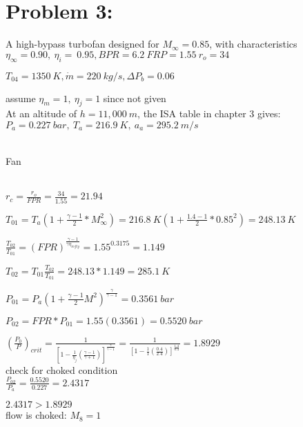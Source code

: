 \documentclass{article}
\begin{document}
\section*{Problem 3:}


A high-bypass turbofan designed for $M_{\infty}=0.85$, with characteristics
\\

$\eta_{\infty}=0.90,\ \eta_{i}=\ 0.95, BPR=6.2\ FRP=1.55\ r_o=34$

$T_{04}=1350\ K, \dot{m}=220\ kg/s, \Delta P_b=0.06$

assume $\eta_m=1,\ \eta_j=1$ since not given
\\

At an altitude of $h=11,000\ m$, the ISA table in chapter 3 gives: 
\\

$P_a=0.227\ bar,\ T_a=216.9\ K,\ a_a=295.2\ m/s$
\\
\\

	\begin{Large}
		Fan
	\end{Large}
\\

$r_c=\frac{r_o}{FPR}=\frac{34}{1.55}=21.94$

$T_{01}=T_a(1+\frac{\gamma-1}{2}*M_{\infty}^{2})=216.8\ K(1+\frac{1.4-1}{2}*0.85^2)=248.13\ K$

$\frac{T_{02}}{T_{01}}=(FPR)^{\frac{\gamma-1}{\gamma \eta_{infty}}}=1.55^{0.3175}=1.149$

$T_{02}=T_{01}\frac{T_{02}}{T_{01}}=248.13*1.149=285.1\ K$

$P_{01}=P_a(1+\frac{\gamma-1}{2}M^2)^{\frac{\gamma}{\gamma-1}}=0.3561\ bar$

$P_{02}=FPR*P_{01}=1.55(0.3561)=0.5520\ bar$

$(\frac{P_0}{P})_{crit}=\frac{1}{[1-\frac{1}{\eta_j}(\frac{\gamma-1}{\gamma+1})]^{\frac{\gamma}{\gamma-1}}}
=\frac{1}{[1-\frac{1}{1}(\frac{0.4}{2.4})]^{\frac{1.4}{0.4}}}=1.8929$
\\

check for choked condition
\\

$\frac{P_{02}}{P_a}=\frac{0.5520}{0.227}=2.4317$

$2.4317>1.8929$
\\

flow is choked: $M_8=1$
\\
\\
\end{document}
